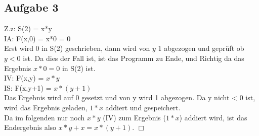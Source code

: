 \documentclass{scrartcl}
\begin{document}
	\subsection*{Aufgabe 3}
	Z.z: S(2) = x*y \\
	IA: F(x,0) = x*0 = 0 \\
  Erst wird $0$ in S(2) geschrieben, dann wird von $y$ $1$ abgezogen und geprüft ob $y < 0$ ist.
  Da dies der Fall ist, ist das Programm zu Ende, und Richtig da das Ergebnis
  $x * 0 = 0$ in S(2) ist.  \\
	IV: F(x,y) = $x * y$ \\
	IS: F(x,y+1) = $x * (y + 1)$ \\
	Das Ergebnis wird auf $0$ gesetzt und von y wird 1 abgezogen.
  Da y nicht < 0 ist, wird das Ergebnis geladen, $1 * x$ addiert und gespeichert.\\
	Da im folgenden nur noch $x * y$ (IV) zum Ergebnis ($1 * x$) addiert wird, ist das
  Endergebnis also $x * y + x = x * (y + 1)$. \hfill $\Box$

\newpage
\end{document}
